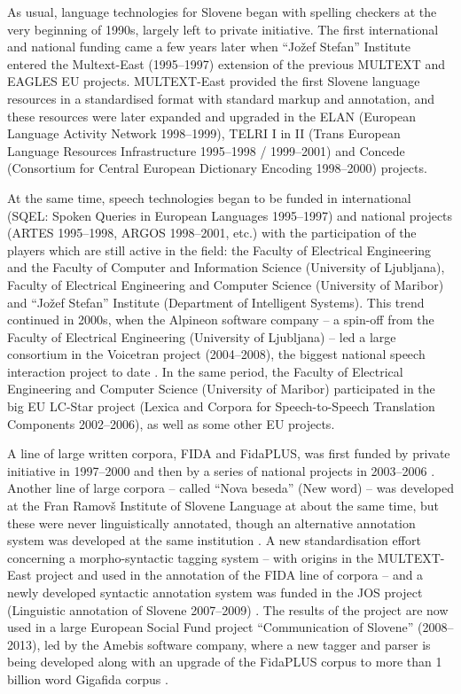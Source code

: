 \begin{multicols}{2}

As usual, language technologies for Slovene began with spelling checkers at the very beginning of 1990s, largely left to private initiative. The first international and national funding came a few years later when “Jožef Stefan” Institute entered the Multext-East (1995--1997) extension of the previous MULTEXT and EAGLES EU projects. MULTEXT-East provided the first Slovene language resources in a standardised format with standard markup and annotation, and these resources were later expanded and upgraded in the ELAN (European Language Activity Network 1998--1999), TELRI I in II (Trans European Language Resources Infrastructure 1995--1998 / 1999--2001) and Concede (Consortium for Central European Dictionary Encoding 1998--2000) projects.

At the same time, speech technologies began to be funded in international (SQEL: Spoken Queries in European Languages 1995--1997) and national projects (ARTES 1995--1998, ARGOS 1998--2001, etc.) with the participation of the players which are still active in the field: the Faculty of Electrical Engineering  and the Faculty of Computer and Information Science (University of Ljub\-ljana), Faculty of Electrical Engineering and Computer Science (University of Maribor) and  “Jožef Stefan” Institute (Department of Intelligent Systems). This trend continued in 2000s, when the Alpineon software company – a spin-off from the Faculty of Electrical Engineering (University of Ljub\-ljana) – led a large consortium in the Voicetran project (2004--2008), the biggest national speech interaction project to date \cite{Alp2}. In the same period, the Faculty of Electrical Engineering and Computer Science (University of Maribor) participated in the big EU LC-Star project (Lexica and Corpora for Speech-to-Speech Translation Components 2002--2006), as well as some other EU projects. 

A line of large written corpora, FIDA and FidaPLUS, was first funded by private initiative in 1997--2000 and then by a series of national projects in 2003--2006 \cite{Fida1}. Another line of large corpora – called ``Nova beseda'' (New word) – was developed at the Fran Ramovš Institute of Slovene Language at about the same time, but these were never linguistically annotated, though an alternative annotation system was developed at the same institution \cite{NB1}.  A new standardisation effort concerning a morpho-syntactic tagging system – with origins in the MULTEXT-East project and used in the annotation of the FIDA line of corpora – and a newly developed syntactic annotation system was funded in the JOS project (Linguistic annotation of Slovene 2007--2009) \cite{JOS1}. The results of the project are now used in a large European Social Fund project ``Communication of Slovene'' (2008--2013), led by the Amebis software company, where a new tagger and parser is being developed along with an upgrade of the FidaPLUS corpus to more than 1 billion word Gigafida corpus \cite{Slo1}. 


\end{multicols}
